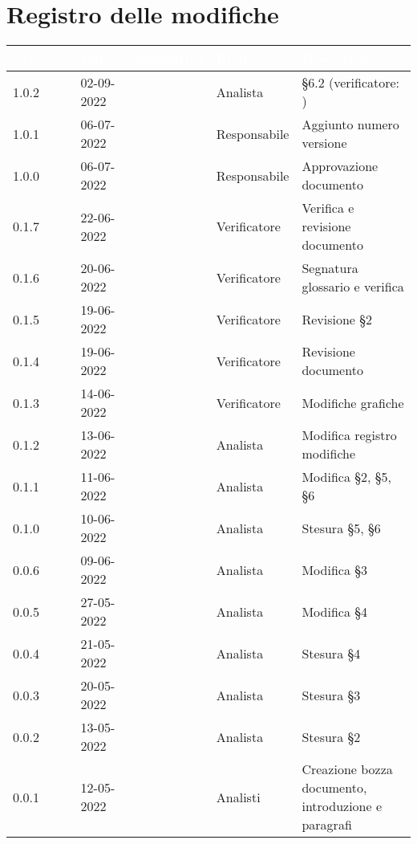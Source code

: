 \section*{Registro delle modifiche}
{


\newlength{\freewidth}
\setlength{\freewidth}{\dimexpr\textwidth-10\tabcolsep}
\renewcommand{\arraystretch}{1.5}
\centering
\setlength{\aboverulesep}{0pt}
\setlength{\belowrulesep}{0pt}
\begin{longtable}{C{.13\freewidth} C{.15\freewidth} C{.26\freewidth} C{.18\freewidth} C{.282379\freewidth}}
	\toprule
{}
\textcolor{white}{\textbf{Versione}}&
\textcolor{white}{\textbf{Data}}&
\textcolor{white}{\textbf{Nominativo}}&
\textcolor{white}{\textbf{Ruolo}}&
\textcolor{white}{\textbf{Descrizione}}\\	
\toprule
\endhead

1.0.2 & 02-09-2022 & \angela{} & Analista & \S 6.2 (verificatore: \matteo{}) \\
1.0.1 & 06-07-2022 & \marcov{} & Responsabile & Aggiunto numero versione \\
1.0.0 & 06-07-2022 & \giulio{} & Responsabile & Approvazione documento \\
0.1.7 & 22-06-2022 & \matteo{} & Verificatore & Verifica e revisione documento \\
0.1.6 & 20-06-2022 & \marcob{} & Verificatore & Segnatura glossario e verifica \\
0.1.5 & 19-06-2022 & \matteo{} & Verificatore & Revisione \S 2 \\
0.1.4 & 19-06-2022 & \matteo{} & Verificatore & Revisione documento \\
0.1.3 & 14-06-2022 & \matteo{} & Verificatore & Modifiche grafiche \\
0.1.2 & 13-06-2022 & \marcob{} & Analista & Modifica registro modifiche \\
0.1.1 & 11-06-2022 & \angela{} & Analista & Modifica \S 2, \S 5, \S 6 \\
0.1.0 & 10-06-2022 & \angela{} & Analista & Stesura \S 5, \S 6 \\
0.0.6 & 09-06-2022 & \marcob{} & Analista & Modifica \S 3 \\
0.0.5 & 27-05-2022 & \angela{} & Analista & Modifica \S 4 \\
0.0.4 & 21-05-2022 & \angela{} & Analista & Stesura \S 4 \\
0.0.3 & 20-05-2022 & \marcob{} & Analista & Stesura \S 3 \\		
0.0.2 & 13-05-2022 & \angela{} & Analista & Stesura \S 2 \\
0.0.1 & 12-05-2022 & \teamname{} & Analisti & Creazione bozza documento, introduzione e paragrafi \\	
\bottomrule
\end{longtable}
}
